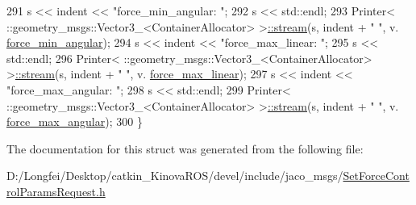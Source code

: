 \begin{DoxyCode}
291     s << indent << \textcolor{stringliteral}{"force\_min\_angular: "};
292     s << std::endl;
293     Printer< ::geometry\_msgs::Vector3\_<ContainerAllocator> >\hyperlink{structros_1_1message__operations_1_1Printer_3_01_1_1jaco__msgs_1_1SetForceControlParamsRequest__16dc020b89aeac404d6fe4c2259e46cf_aa3e2350f9d31ee8c1f97b77964bd0cfa}{::stream}(s, indent + \textcolor{stringliteral}{"  "}, v.
      \hyperlink{structjaco__msgs_1_1SetForceControlParamsRequest___ab84d0d8b19f11eca2319c4ef903caafd}{force\_min\_angular});
294     s << indent << \textcolor{stringliteral}{"force\_max\_linear: "};
295     s << std::endl;
296     Printer< ::geometry\_msgs::Vector3\_<ContainerAllocator> >\hyperlink{structros_1_1message__operations_1_1Printer_3_01_1_1jaco__msgs_1_1SetForceControlParamsRequest__16dc020b89aeac404d6fe4c2259e46cf_aa3e2350f9d31ee8c1f97b77964bd0cfa}{::stream}(s, indent + \textcolor{stringliteral}{"  "}, v.
      \hyperlink{structjaco__msgs_1_1SetForceControlParamsRequest___a89805bac05f838a5bc70a641539715f0}{force\_max\_linear});
297     s << indent << \textcolor{stringliteral}{"force\_max\_angular: "};
298     s << std::endl;
299     Printer< ::geometry\_msgs::Vector3\_<ContainerAllocator> >\hyperlink{structros_1_1message__operations_1_1Printer_3_01_1_1jaco__msgs_1_1SetForceControlParamsRequest__16dc020b89aeac404d6fe4c2259e46cf_aa3e2350f9d31ee8c1f97b77964bd0cfa}{::stream}(s, indent + \textcolor{stringliteral}{"  "}, v.
      \hyperlink{structjaco__msgs_1_1SetForceControlParamsRequest___afa6dc239b7bd0cd6b43b4ccea1ec92af}{force\_max\_angular});
300   \}
\end{DoxyCode}


The documentation for this struct was generated from the following file\+:\begin{DoxyCompactItemize}
\item 
D\+:/\+Longfei/\+Desktop/catkin\+\_\+\+Kinova\+R\+O\+S/devel/include/jaco\+\_\+msgs/\hyperlink{SetForceControlParamsRequest_8h}{Set\+Force\+Control\+Params\+Request.\+h}\end{DoxyCompactItemize}
